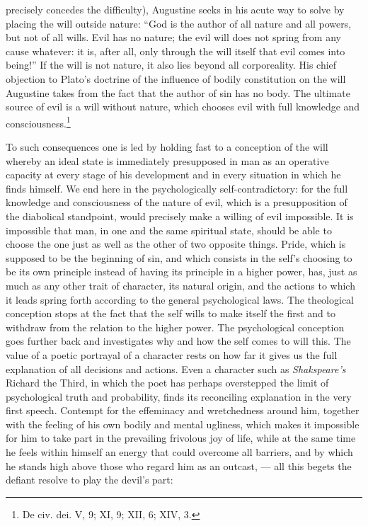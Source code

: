 \documentclass[12pt,a4paper,openany]{book}
\newcommand{\opage}[1]{\marginnote{\footnotesize\textit{[#1]}}}
\begin{document}
precisely concedes the difficulty), Augustine seeks in his acute way to
solve by placing the will outside nature: ``God is the author of all nature
and all powers, but not of all wills. Evil has no nature; the evil will does
not spring from any cause whatever: it is, after all, only through the will
itself that evil comes into being!'' If the will is not nature, it also lies
beyond all corporeality. His chief objection to Plato's doctrine of the
influence of bodily \opage{139}constitution on the will Augustine takes from
the fact that the author of sin has no body. The ultimate source of evil is
a will without nature, which chooses evil with full knowledge and
consciousness.\footnote[1]{De civ. dei. V, 9; XI, 9; XII, 6; XIV, 3.}

To such consequences one is led by holding fast to a conception of the will
whereby an ideal state is immediately presupposed in man as an operative
capacity at every stage of his development and in every situation in which
he finds himself. We end here in the psychologically self-contradictory: for
the full knowledge and consciousness of the nature of evil, which is a
presupposition of the diabolical standpoint, would precisely make a willing
of evil impossible. It is impossible that man, in one and the same spiritual
state, should be able to choose the one just as well as the other of two
opposite things. Pride, which is supposed to be the beginning of sin, and
which consists in the self's choosing to be its own principle instead of
having its principle in a higher power, has, just as much as any other trait
of character, its natural origin, and the actions to which it leads spring
forth according to the general psychological laws. The theological
conception stops at the fact that the self wills to make itself the first
and to withdraw from the relation to the higher power. The psychological
conception goes further back and investigates why and how the self comes to
will this. \opage{140}The value of a poetic portrayal of a character rests
on how far it gives us the full explanation of all decisions and actions.
Even a character such as \emph{Shakspeare's} Richard the Third, in which the
poet has perhaps overstepped the limit of psychological truth and
probability, finds its reconciling explanation in the very first speech.
Contempt for the effeminacy and wretchedness around him, together with the
feeling of his own bodily and mental ugliness, which makes it impossible for
him to take part in the prevailing frivolous joy of life, while at the same
time he feels within himself an energy that could overcome all barriers, and
by which he stands high above those who regard him as an outcast, --- all
this begets the defiant resolve to play the devil's part:
\end{document}
